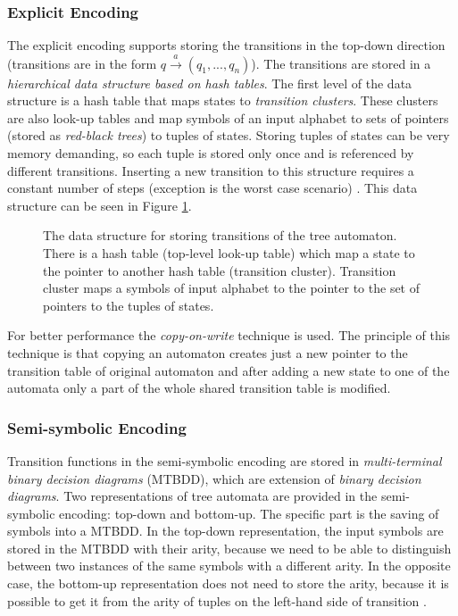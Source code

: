 \subsubsection{Explicit Encoding}
\label{sectionExplicitEnc}
The explicit encoding supports storing the transitions in the top-down direction (transitions are in the form $q \xrightarrow{a} (q_1,...,q_n)$). The transitions
are stored in a \emph{hierarchical data structure based on hash tables}. The first level of the data structure is a hash table
that maps states to \emph{transition clusters}. These clusters are also look-up tables and map symbols of an input alphabet
to sets of pointers (stored as \emph{red-black trees}) to tuples of states. Storing tuples of states can be very memory demanding, so each tuple is stored
only once and is referenced by different transitions. 
Inserting a new transition to this structure requires a constant number of steps (exception is the worst case scenario) %
\cite{libvata}. This data structure can be seen in Figure \ref{figExplicitTreeDataStr}.

\begin{figure}
\begin{center}

    \caption{The data structure for storing transitions of the tree automaton. There is a hash table (top-level look-up table) 
      which map a state to the pointer to another hash table (transition cluster). Transition cluster
      maps a symbols of input alphabet to the pointer to the set of pointers to the tuples of states.}
		\label{figExplicitTreeDataStr}
\end{center}
\end{figure}


For better performance the \emph{copy-on-write} technique \cite{libvata} is used. The principle of this technique is 
that copying an automaton creates just a new pointer to the transition table of original automaton and after adding a new state to one of the automata 
only a part of the whole shared transition table is modified. 

\subsubsection{Semi-symbolic Encoding}
Transition functions in the semi-symbolic encoding are stored in \emph{multi-terminal binary decision diagrams} (MTBDD), 
which are extension of \emph{binary decision 
diagrams}. Two representations of tree automata are provided in the semi-symbolic encoding: top-down and bottom-up. 
The specific part is the saving of symbols into a MTBDD. In the top-down representation, the input
symbols are stored in the MTBDD with their arity, because we need to be able to distinguish between two instances of the same symbols with a different arity.
In the opposite case, the bottom-up representation does not need to store the arity, because it is possible to get it from the arity of tuples 
on the left-hand side of transition \cite{libvata}.

